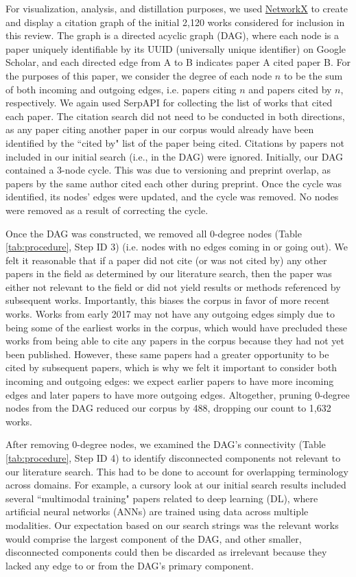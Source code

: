 \documentclass[manuscript,screen,review]{acmart}
\begin{document}
For visualization, analysis, and distillation purposes, we used \href{https://networkx.org/}{NetworkX} to create and display a citation graph of the initial 2,120 works considered for inclusion in this review. The graph is a directed acyclic graph (DAG), where each node is a paper uniquely identifiable by its UUID (universally unique identifier) on Google Scholar, and each directed edge from A to B indicates paper A cited paper B. For the purposes of this paper, we consider the degree of each node $n$ to be the sum of both incoming and outgoing edges, i.e. papers citing $n$ and papers cited by $n$, respectively. We again used SerpAPI for collecting the list of works that cited each paper. The citation search did not need to be conducted in both directions, as any paper citing another paper in our corpus would already have been identified by the ``cited by" list of the paper being cited. Citations by papers not included in our initial search (i.e., in the DAG) were ignored. Initially, our DAG contained a 3-node cycle. This was due to versioning and preprint overlap, as papers by the same author cited each other during preprint. Once the cycle was identified, its nodes' edges were updated, and the cycle was removed. No nodes were removed as a result of correcting the cycle.

Once the DAG was constructed, we removed all 0-degree nodes (Table \ref{tab:procedure}, Step ID 3) (i.e. nodes with no edges coming in or going out). We felt it reasonable that if a paper did not cite (or was not cited by) any other papers in the field as determined by our literature search, then the paper was either not relevant to the field or did not yield results or methods referenced by subsequent works. Importantly, this biases the corpus in favor of more recent works. Works from early 2017 may not have any outgoing edges simply due to being some of the earliest works in the corpus, which would have precluded these works from being able to cite any papers in the corpus because they had not yet been published. However, these same papers had a greater opportunity to be cited by subsequent papers, which is why we felt it important to consider both incoming and outgoing edges: we expect earlier papers to have more incoming edges and later papers to have more outgoing edges. Altogether, pruning 0-degree nodes from the DAG reduced our corpus by 488, dropping our count to 1,632 works.

After removing 0-degree nodes, we examined the DAG's connectivity (Table \ref{tab:procedure}, Step ID 4) to identify disconnected components not relevant to our literature search. This had to be done to account for overlapping terminology across domains. For example, a cursory look at our initial search results included several ``multimodal training" papers related to deep learning (DL), where artificial neural networks (ANNs) are trained using data across multiple modalities. Our expectation based on our search strings was the relevant works would comprise the largest component of the DAG, and other smaller, disconnected components could then be discarded as irrelevant because they lacked any edge to or from the DAG's primary component.
\end{document}

